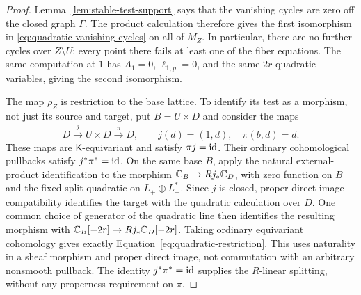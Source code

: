 \begin{proof}
Lemma~\ref{lem:stable-test-support} says that the vanishing cycles are
zero off the closed graph $\Gamma$.  The product calculation therefore
gives the first isomorphism in
\eqref{eq:quadratic-vanishing-cycles} on all of $M_Z$.  In particular,
there are no further cycles over $Z\setminus U$: every point there
fails at least one of the fiber equations.  The same computation at
$1$ has $A_1=0$, $\ell_{1,p}=0$, and the same $2r$ quadratic variables,
giving the second isomorphism.

The map $\rho_Z$ is restriction to the base lattice.  To identify its
test as a morphism, not just its source and target, put $B=U\times D$
and consider the maps
\[
 D\xrightarrow{\,j\,}U\times D\xrightarrow{\,\pi\,}D,
 \qquad j(d)=(1,d),\quad \pi(b,d)=d.
\]
These maps are $\mathsf K$-equivariant and satisfy $\pi j=\mathrm{id}$.  Their ordinary
cohomological pullbacks satisfy $j^*\pi^*=\mathrm{id}$.
On the same base $B$, apply the natural external-product identification
to the morphism $\mathbb C_B\to Rj_*\mathbb C_D$, with zero function on $B$ and the
fixed split quadratic on $L_+\oplus L_+^*$.
Since $j$ is closed, proper-direct-image compatibility identifies the
target with the quadratic calculation over $D$.  One common choice of
generator of the quadratic line then identifies the resulting morphism
with $\mathbb C_B[-2r]\to Rj_*\mathbb C_D[-2r]$.
Taking ordinary equivariant cohomology gives exactly
Equation~\eqref{eq:quadratic-restriction}.  This uses naturality in a
sheaf morphism and proper direct image, not commutation with an arbitrary
nonsmooth pullback.  The identity $j^*\pi^*=\mathrm{id}$ supplies the
$R$-linear splitting, without any properness requirement on $\pi$.
\end{proof}

